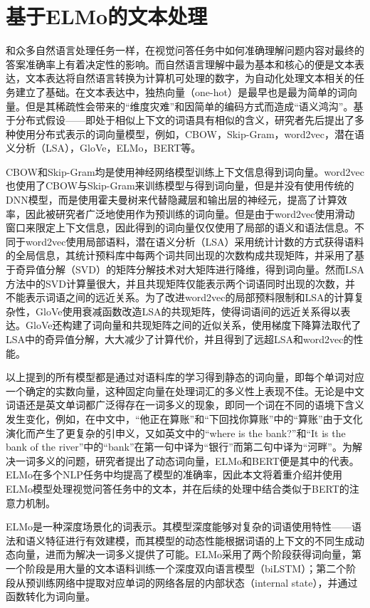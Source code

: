 \section{基于ELMo的文本处理}
和众多自然语言处理任务一样，在视觉问答任务中如何准确理解问题内容对最终的答案准确率上有着决定性的影响。而自然语言理解中最为基本和核心的便是文本表达，文本表达将自然语言转换为计算机可处理的数字，为自动化处理文本相关的任务建立了基础。在文本表达中，独热向量（one-hot）是最早也是最为简单的词向量。但是其稀疏性会带来的“维度灾难”和因简单的编码方式而造成“语义鸿沟”。基于分布式假设——即处于相似上下文的词语具有相似的含义，研究者先后提出了多种使用分布式表示的词向量模型，例如，CBOW，Skip-Gram，word2vec，潜在语义分析（LSA），GloVe，ELMo，BERT等。

CBOW和Skip-Gram均是使用神经网络模型训练上下文信息得到词向量。word2vec也使用了CBOW与Skip-Gram来训练模型与得到词向量，但是并没有使用传统的DNN模型，而是使用霍夫曼树来代替隐藏层和输出层的神经元，提高了计算效率，因此被研究者广泛地使用作为预训练的词向量。但是由于word2vec使用滑动窗口来限定上下文信息，因此得到的词向量仅仅使用了局部的语义和语法信息。不同于word2vec使用局部语料，潜在语义分析（LSA）采用统计计数的方式获得语料的全局信息，其统计预料库中每两个词共同出现的次数构成共现矩阵，并采用了基于奇异值分解（SVD）的矩阵分解技术对大矩阵进行降维，得到词向量。然而LSA方法中的SVD计算量很大，并且共现矩阵仅能表示两个词语同时出现的次数，并不能表示词语之间的远近关系。为了改进word2vec的局部预料限制和LSA的计算复杂性，GloVe使用衰减函数改造LSA的共现矩阵，使得词语间的远近关系得以表达。GloVe还构建了词向量和共现矩阵之间的近似关系，使用梯度下降算法取代了LSA中的奇异值分解，大大减少了计算代价，并且得到了远超LSA和word2vec的性能。

以上提到的所有模型都是通过对语料库的学习得到静态的词向量，即每个单词对应一个确定的实数向量，这种固定向量在处理词汇的多义性上表现不佳。无论是中文词语还是英文单词都广泛得存在一词多义的现象，即同一个词在不同的语境下含义发生变化，例如，在中文中，“他正在算账”和“下回找你算账”中的“算账”由于文化演化而产生了更复杂的引申义，又如英文中的“where is the bank?”和“It is the bank of the river”中的“bank”在第一句中译为“银行”而第二句中译为“河畔”。为解决一词多义的问题，研究者提出了动态词向量，ELMo和BERT便是其中的代表。ELMo在多个NLP任务中均提高了模型的准确率，因此本文将着重介绍并使用ELMo模型处理视觉问答任务中的文本，并在后续的处理中结合类似于BERT的注意力机制。

ELMo是一种深度场景化的词表示。其模型深度能够对复杂的词语使用特性——语法和语义特征进行有效建模，而其模型的动态性能根据词语的上下文的不同生成动态向量，进而为解决一词多义提供了可能。ELMo采用了两个阶段获得词向量，第一个阶段是用大量的文本语料训练一个深度双向语言模型（biLSTM）；第二个阶段从预训练网络中提取对应单词的网络各层的内部状态（internal state），并通过函数转化为词向量。

